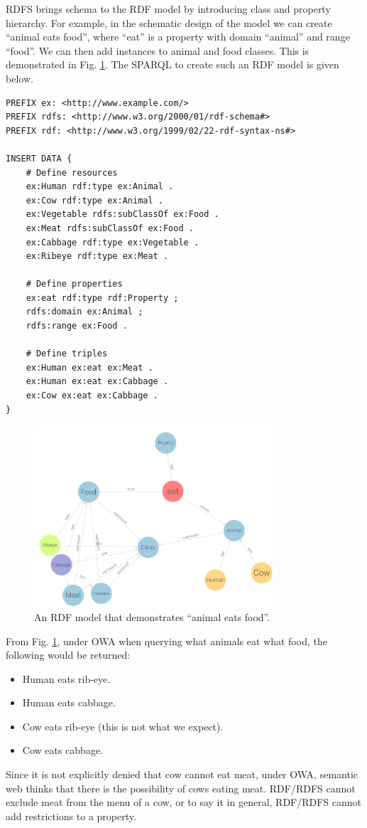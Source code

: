 RDFS brings schema to the RDF model by introducing class and property hierarchy. For example, in the schematic design of the model we can create ``animal eats food'', where ``eat'' is a property with domain ``animal'' and range ``food''. We can then add instances to animal and food classes. This is demonstrated in Fig. \ref{fig:coweatgrass}. The SPARQL to create such an RDF model is given below.
\begin{lstlisting}
PREFIX ex: <http://www.example.com/>
PREFIX rdfs: <http://www.w3.org/2000/01/rdf-schema#>
PREFIX rdf: <http://www.w3.org/1999/02/22-rdf-syntax-ns#>

INSERT DATA {
	# Define resources
	ex:Human rdf:type ex:Animal .
	ex:Cow rdf:type ex:Animal .
	ex:Vegetable rdfs:subClassOf ex:Food .
	ex:Meat rdfs:subClassOf ex:Food .
	ex:Cabbage rdf:type ex:Vegetable .
	ex:Ribeye rdf:type ex:Meat .
	
	# Define properties
	ex:eat rdf:type rdf:Property ;
	rdfs:domain ex:Animal ;
	rdfs:range ex:Food .
	
	# Define triples
	ex:Human ex:eat ex:Meat .
	ex:Human ex:eat ex:Cabbage .
	ex:Cow ex:eat ex:Cabbage .
}
\end{lstlisting}

\begin{figure}[htbp]
	\centering
	\includegraphics[width=0.8\textwidth]{chapters/part-4/figures/coweatgrass.png}
	\caption{An RDF model that demonstrates ``animal eats food''.}
	\label{fig:coweatgrass}
\end{figure}

From Fig. \ref{fig:coweatgrass}, under OWA when querying what animals eat what food, the following would be returned:
\begin{itemize}
	\item Human eats rib-eye.
	\item Human eats cabbage.
	\item Cow eats rib-eye (this is not what we expect).
	\item Cow eats cabbage.
\end{itemize}
Since it is not explicitly denied that cow cannot eat meat, under OWA, semantic web thinks that there is the possibility of cows eating meat. RDF/RDFS cannot exclude meat from the menu of a cow, or to say it in general, RDF/RDFS cannot add restrictions to a property.

